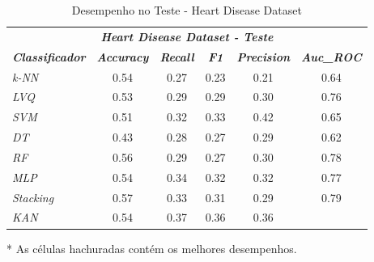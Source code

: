 \documentclass[journal]{IEEEtran}
\begin{document}
\begin{table}[h!]
	\caption{Desempenho no Teste - Heart Disease Dataset}
	\label{tab:16}
	\begin{threeparttable}
		\begin{tabular}{lccccc}
			\hline
			\multicolumn{6}{c}{\textit{\textbf{Heart Disease Dataset - Teste}}}                                                                                                                                  \\
			\multicolumn{1}{l|}{\textit{\textbf{Classificador}}} & \textit{\textbf{Accuracy}} & \textit{\textbf{Recall}}  & \textit{\textbf{F1}}      & \textit{\textbf{Precision}} & \textit{\textbf{Auc\_ROC}} \\ \hline
			\multicolumn{1}{l|}{\textit{k-NN}}                   & 0.54                       & 0.27                      & 0.23                      & 0.21                        & 0.64                       \\
			\multicolumn{1}{l|}{\textit{LVQ}}                    & 0.53                       & 0.29                      & 0.29                      & 0.30                        & 0.76                       \\
			\multicolumn{1}{l|}{\textit{SVM}}                    & 0.51                       & 0.32                      & 0.33                      & \cellcolor{lightgray}0.42   & 0.65                       \\
			\multicolumn{1}{l|}{\textit{DT}}                     & 0.43                       & 0.28                      & 0.27                      & 0.29                        & 0.62                       \\
			\multicolumn{1}{l|}{\textit{RF}}                     & 0.56                       & 0.29                      & 0.27                      & 0.30                        & 0.78                       \\
			\multicolumn{1}{l|}{\textit{MLP}}                    & 0.54                       & 0.34                      & 0.32                      & 0.32                        & 0.77                       \\
			\multicolumn{1}{l|}{\textit{Stacking}}               & \cellcolor{lightgray}0.57  & 0.33                      & 0.31                      & 0.29                        & \cellcolor{lightgray}0.79  \\
			\multicolumn{1}{l|}{\textit{KAN}}                    & 0.54                       & \cellcolor{lightgray}0.37 & \cellcolor{lightgray}0.36 & 0.36                        &                            \\
			\hline
		\end{tabular}
		\begin{tablenotes}\footnotesize
			\item[*] As células hachuradas contém os melhores desempenhos.
		\end{tablenotes}
	\end{threeparttable}
\end{table}
\end{document}
